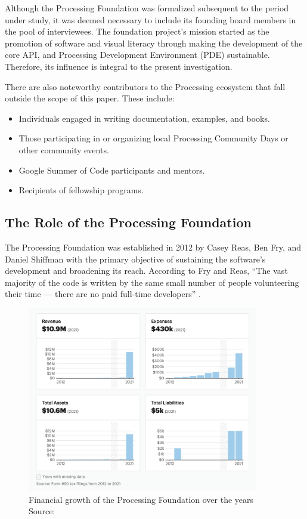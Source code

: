 \documentclass{article}
\begin{document}
Although the Processing Foundation was formalized subsequent to the period under study, it was deemed necessary to include its founding board members in the pool of interviewees. The foundation project’s mission started as the promotion of software and visual literacy through making the development of the core API, and Processing Development Environment (PDE) sustainable. Therefore, its influence is integral to the present investigation.\parencite{robertsProcessingFoundationForm2013}

There are also noteworthy contributors to the Processing ecosystem that fall outside the scope of this paper. These include:

\begin{itemize}
    \item Individuals engaged in writing documentation, examples, and books.
    \item Those participating in or organizing local Processing Community Days or other community events.
    \item Google Summer of Code participants and mentors.
    \item Recipients of fellowship programs.
\end{itemize}

\subsection{The Role of the Processing Foundation}

The Processing Foundation was established in 2012 by Casey Reas, Ben Fry, and Daniel Shiffman with the primary objective of sustaining the software's development and broadening its reach. According to Fry and Reas, ``The vast majority of the code is written by the same small number of people volunteering their time — there are no paid full-time developers'' \parencite[p.~13]{fryModernPrometheusHistory2018}.

\begin{figure}[h]
    \centering
    \includegraphics[width=0.9\textwidth]{images/foundation-finances.png} 
    \caption{Financial growth of the Processing Foundation over the years Source: \parencite{ProcessingFoundationNonprofit2013}}
    \label{fig:foundation-finances}
\end{figure}
\end{document}
